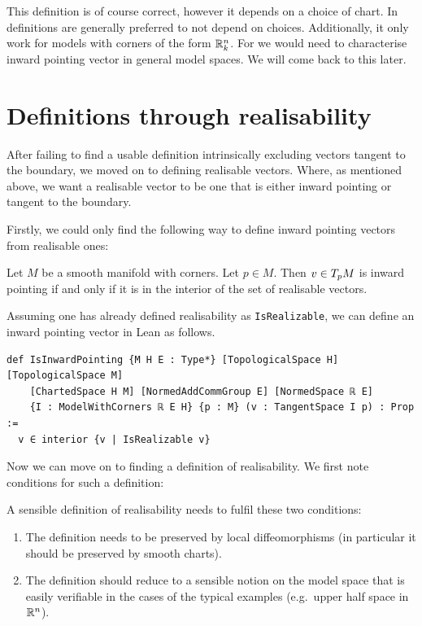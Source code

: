 This definition is of course correct, however it depends on a choice of chart. 
In \mathlib definitions are generally preferred to not depend on choices.  Additionally, it only work for models with corners of the form $\mathbb{R}^n_k$. For \mathlib we would need to characterise inward pointing vector in general model spaces. We will come back to this later. 

\section{Definitions through realisability}

After failing to find a usable definition intrinsically excluding vectors tangent to the boundary, we moved on to defining realisable vectors.
Where, as mentioned above, we want a realisable vector to be one that is either inward pointing or tangent to the boundary. 

Firstly, we could only find the following way to define inward pointing vectors from realisable ones: 

\begin{defi}
    Let $M$ be a smooth manifold with corners. Let $p \in M$. Then $v \in T_{p}M$ is inward pointing if and only if it is in the interior of the set of realisable vectors. 
\end{defi}

Assuming one has already defined realisability as \lstinline|IsRealizable|, we can define an inward pointing vector in Lean as follows. 

\begin{lstlisting}
def IsInwardPointing {M H E : Type*} [TopologicalSpace H] [TopologicalSpace M]
    [ChartedSpace H M] [NormedAddCommGroup E] [NormedSpace ℝ E] 
    {I : ModelWithCorners ℝ E H} {p : M} (v : TangentSpace I p) : Prop :=
  v ∈ interior {v | IsRealizable v}
\end{lstlisting}

Now we can move on to finding a definition of realisability. We first note conditions for such a definition: 

\begin{rem}\label{rem:realcond}
    A sensible definition of realisability needs to fulfil these two conditions: 
    \begin{enumerate}
        \item The definition needs to be preserved by local diffeomorphisms (in particular it should be preserved by smooth charts). \label{rem:realcond1}
        \item The definition should reduce to a sensible notion on the model space that is easily verifiable in the cases of the typical examples (e.g.\ upper half space in $\mathbb{R}^n$). \label{rem:realcond2}
    \end{enumerate}
\end{rem}


